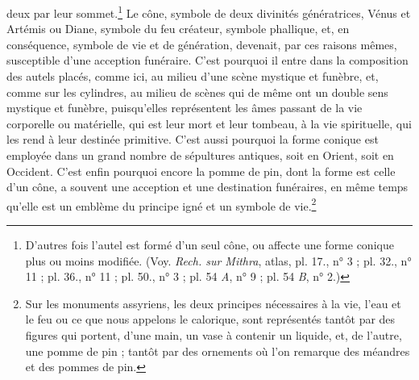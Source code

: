 \documentclass{article}
\begin{document}
deux par leur sommet.\footnote{D'autres fois l'autel est formé d'un seul cône, ou affecte une forme conique plus ou moins modifiée. (Voy. \emph{Rech. sur Mithra}, atlas, pl. 17., n° 3 ; pl. 32., n° 11 ; pl. 36., n° 11 ; pl. 50., n° 3 ; pl. 54 \emph{A}, n° 9 ; pl. 54 \emph{B}, n° 2.)} Le cône, symbole de deux divinités génératrices, Vénus et Artémis ou Diane, symbole du feu créateur, symbole phallique, et, en conséquence, symbole de vie et de génération, devenait, par ces raisons mêmes, susceptible d'une acception funéraire. C'est pourquoi il entre dans la composition des autels placés, comme ici, au milieu d'une scène mystique et funèbre, et, comme sur les cylindres, au milieu de scènes qui de même ont un double sens mystique et funèbre, puisqu'elles représentent les âmes passant de la vie corporelle ou matérielle, qui est leur mort et leur tombeau, à la vie spirituelle, qui les rend à leur destinée primitive. C'est aussi pourquoi la forme conique est employée dans un grand nombre de sépultures antiques, soit en Orient, soit en Occident. C'est enfin pourquoi encore la pomme de pin, dont la forme est celle d'un cône, a souvent une acception et une destination funéraires, en même temps qu'elle est un emblème du principe igné et un symbole de vie.\footnote{Sur les monuments assyriens, les deux principes nécessaires à la vie, l'eau et le feu ou ce que nous appelons le calorique, sont représentés tantôt par des figures qui portent, d'une main, un vase à contenir un liquide, et, de l'autre, une pomme de pin ; tantôt par des ornements où l'on remarque des méandres et des pommes de pin.}
\end{document}

